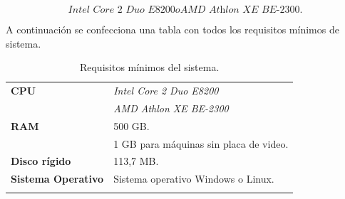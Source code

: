 \[
\textit{Intel Core 2 Duo E8200} o \textit{AMD Athlon XE BE-2300}.
\]

A continuación se confecciona una tabla con todos los requisitos mínimos de sistema.

\begin{longtable}{|l|l|}
    \hline
    \textbf{CPU} & \textit{Intel Core 2 Duo E8200}\\
                 & \textit{AMD Athlon XE BE-2300}\\
    \hline
    \textbf{RAM} & 500 GB.\\
                 & 1 GB para máquinas sin placa de video.\\
    \hline
    \textbf{Disco rígido} & 113,7 MB.\\
    \hline
    \textbf{Sistema Operativo} & Sistema operativo Windows o Linux.\\
    \hline
    \caption{Requisitos mínimos del sistema.}\\
\end{longtable}

